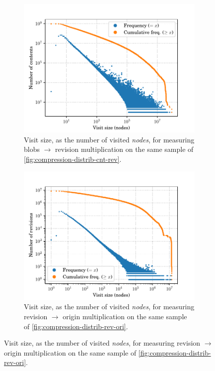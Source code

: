 \begin{figure}
    \begin{subfigure}{.49\textwidth}
        \centering
        \includegraphics[width=\linewidth]{img/compression/distributions/contents_node_size}
        \caption{Visit size, as the number of visited \emph{nodes}, for
            measuring blobs $\to$ revision multiplication on the same sample of
            \cref{fig:compression-distrib-cnt-rev}.}%
        \label{fig:compression-size-cnt-rev}
    \end{subfigure}\hfill%
    \begin{subfigure}{.49\textwidth}
        \centering
        \includegraphics[width=\linewidth]{img/compression/distributions/revisions_node_size}
        \caption{Visit size, as the number of visited \emph{nodes}, for
            measuring revision $\to$ origin multiplication on the same sample
            of \cref{fig:compression-distrib-rev-ori}.}%
        \label{fig:compression-size-rev-ori}
    \end{subfigure}


\end{figure}
